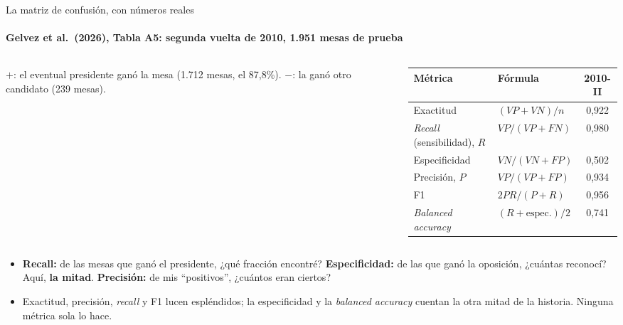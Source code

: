 \documentclass{beamer}
\newcommand{\1}{\mathbb{I}}
\begin{document}
\begin{frame}{La matriz de confusión, con números reales}
\framesubtitle{Gelvez et al.\ (2026), Tabla A5: segunda vuelta de 2010, 1.951 mesas de prueba}
\small
\begin{columns}[T]
\begin{column}{0.44\textwidth}
\begin{center}
\end{center}
\vspace{0.05cm}
\scriptsize
$+$: el eventual presidente ganó la mesa (1.712 mesas, el 87,8\%). $-$: la ganó otro candidato (239 mesas).
\end{column}
\begin{column}{0.56\textwidth}
\scriptsize
\setlength{\tabcolsep}{2pt}
\renewcommand{\arraystretch}{1.25}
\begin{tabular}{llc}
\hline
Métrica & Fórmula & 2010-II \\
\hline
Exactitud & $(VP+VN)/n$ & 0,922 \\
\emph{Recall} (sensibilidad), $R$ & $VP/(VP+FN)$ & 0,980 \\
Especificidad & $VN/(VN+FP)$ & 0,502 \\
Precisión, $P$ & $VP/(VP+FP)$ & 0,934 \\
F1 & $2PR/(P+R)$ & 0,956 \\
\emph{Balanced accuracy} & $(R + \text{espec.})/2$ & 0,741 \\
\hline
\end{tabular}
\end{column}
\end{columns}
\pause
\vspace{0.15cm}
\begin{itemize}\itemsep3pt
  \item \textbf{Recall:} de las mesas que ganó el presidente, ¿qué fracción encontré? \textbf{Especificidad:} de las que ganó la oposición, ¿cuántas reconocí? Aquí, \textbf{la mitad}. \textbf{Precisión:} de mis ``positivos'', ¿cuántos eran ciertos?
  \item Exactitud, precisión, \emph{recall} y F1 lucen espléndidos; la especificidad y la \emph{balanced accuracy} cuentan la otra mitad de la historia. Ninguna métrica sola lo hace.
\end{itemize}
\end{frame}
\end{document}
